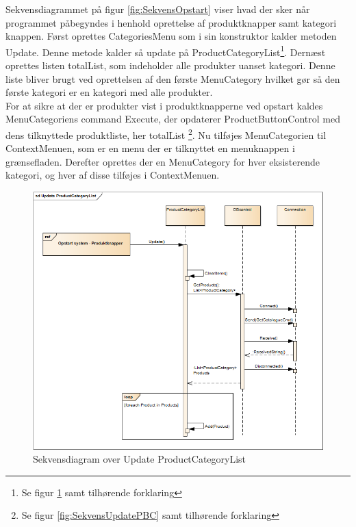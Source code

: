 Sekvensdiagrammet på figur \ref{fig:SekvensOpstart} viser hvad der sker når programmet påbegyndes i henhold oprettelse af produktknapper samt kategori knappen. Først oprettes CategoriesMenu som i sin konstruktor kalder metoden Update. Denne metode kalder så update på ProductCategoryList\footnote{Se figur \ref{fig:SekvensUpdatePCL} samt tilhørende forklaring}. Dernæst oprettes listen totalList, som indeholder alle produkter uanset kategori. Denne liste bliver brugt ved oprettelsen af den første MenuCategory hvilket gør så den første kategori er en kategori med alle produkter. \\
For at sikre at der er produkter vist i produktknapperne ved opstart kaldes MenuCategoriens command Execute, der opdaterer ProductButtonControl med dens tilknyttede produktliste, her totalList \footnote{Se figur \ref{fig:SekvensUpdatePBC} samt tilhørende forklaring}. Nu tilføjes MenuCategorien til ContextMenuen, som er en menu der er tilknyttet en menuknappen i grænsefladen. Derefter oprettes der en MenuCategory for hver eksisterende kategori, og hver af disse tilføjes i ContextMenuen.

\begin{figure}[H]
	\centering
	\includegraphics[width=1\textwidth]{Systemdesign/Frontend/GUI/DesignOgStruktur/Pics/UpdateProductCategoryList}
	\caption{Sekvensdiagram over Update ProductCategoryList}
	\label{fig:SekvensUpdatePCL}
\end{figure}


